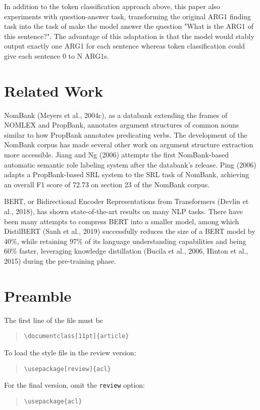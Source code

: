 \documentclass[11pt]{article}
\begin{document}
In addition to the token classification approach above, this paper also experiments with question-answer task, transforming the original ARG1 finding task into the task of make the model answer the question "What is the ARG1 of this sentence?". The advantage of this adaptation is that the model would stably output exactly one ARG1 for each sentence whereas token classification could give each sentence 0 to N ARG1s.


\section{Related Work}

NomBank (Meyers et al., 2004c), as a databank extending the frames of NOMLEX and PropBank, annotates argument structures of common nouns similar to how PropBank annotates predicating verbs. The development of the NomBank corpus has made several other work on argument structure extraction more accessible. Jiang and Ng (2006) attempts the first NomBank-based automatic semantic role labeling system after the databank's release. Ping (2006)  adapts a PropBank-based SRL system to the SRL task of NomBank, achieving an overall F1 score of 72.73 on section 23 of the NomBank corpus.

BERT, or Bidirectional Encoder Representations from Transformers (Devlin et al., 2018), has shown state-of-the-art results on many NLP tasks. There have been many attempts to compress BERT into a smaller model, among which DistilBERT (Sanh et al., 2019) successfully reduces the size of a BERT model by 40\%, while retaining 97\% of its language understanding capabilities and being 60\% faster, leveraging  knowledge distillation (Bucila et al., 2006, Hinton et al., 2015) during the pre-training phase.

\section{Preamble}

The first line of the file must be
\begin{quote}
  \begin{verbatim}
\documentclass[11pt]{article}
\end{verbatim}
\end{quote}

To load the style file in the review version:
\begin{quote}
  \begin{verbatim}
\usepackage[review]{acl}
\end{verbatim}
\end{quote}
For the final version, omit the \verb|review| option:
\begin{quote}
  \begin{verbatim}
\usepackage{acl}
\end{verbatim}
\end{quote}
\end{document}

